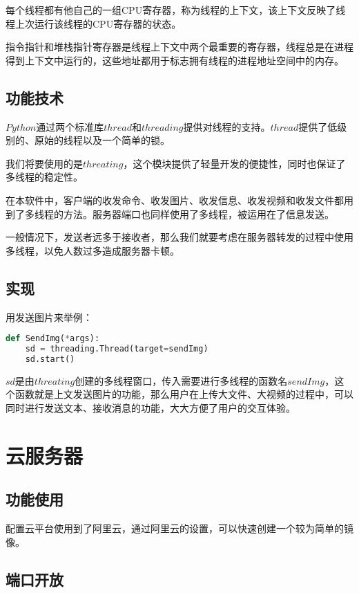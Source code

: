 \documentclass[forprint]{OSPaper}
\begin{document}
每个线程都有他自己的一组CPU寄存器，称为线程的上下文，该上下文反映了线程上次运行该线程的CPU寄存器的状态。

指令指针和堆栈指针寄存器是线程上下文中两个最重要的寄存器，线程总是在进程得到上下文中运行的，这些地址都用于标志拥有线程的进程地址空间中的内存。

\subsection{功能技术}

$ Python $通过两个标准库$ thread $和$ threading $提供对线程的支持。$ thread $提供了低级别的、原始的线程以及一个简单的锁。

我们将要使用的是$threating$，这个模块提供了轻量开发的便捷性，同时也保证了多线程的稳定性。

在本软件中，客户端的收发命令、收发图片、收发信息、收发视频和收发文件都用到了多线程的方法。服务器端口也同样使用了多线程，被运用在了信息发送。

一般情况下，发送者远多于接收者，那么我们就要考虑在服务器转发的过程中使用多线程，以免人数过多造成服务器卡顿。

\subsection{实现}

用发送图片来举例：

\begin{lstlisting}[language=Python]
def SendImg(*args):
	sd = threading.Thread(target=sendImg)
	sd.start()
\end{lstlisting}

$sd$是由$threating$创建的多线程窗口，传入需要进行多线程的函数名$sendImg$，这个函数就是上文发送图片的功能，那么用户在上传大文件、大视频的过程中，可以同时进行发送文本、接收消息的功能，大大方便了用户的交互体验。

\section{云服务器}

\subsection{功能使用}

配置云平台使用到了阿里云，通过阿里云的设置，可以快速创建一个较为简单的镜像。

\subsection{端口开放}
\end{document}
